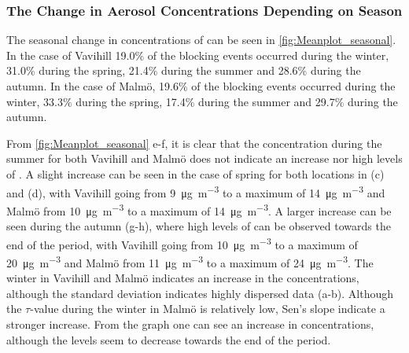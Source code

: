  

\subsubsection{The Change in Aerosol Concentrations Depending on Season}
The seasonal change in concentrations of \PM can be seen in \autoref{fig:Meanplot_seasonal}. In the case of Vavihill 19.0\% of the blocking events occurred during the winter, 31.0\% during the spring, 21.4\% during the summer and 28.6\% during the autumn. In the case of Malmö, 19.6\% of the blocking events occurred during the winter, 33.3\% during the spring, 17.4\% during the summer and 29.7\% during the autumn. 

From \autoref{fig:Meanplot_seasonal} e-f, it is clear that the concentration during the summer for both Vavihill and Malmö does not indicate an increase nor high levels of \PM. A slight increase can be seen in the case of spring for both locations in (c) and (d), with Vavihill going from \SI{9}{\micro\gram\per\meter\cubed} to a maximum of \SI{14}{\micro\gram\per\meter\cubed} and Malmö from \SI{10}{\micro\gram\per\meter\cubed} to a maximum of \SI{14}{\micro\gram\per\meter\cubed}. A larger increase can be seen during the autumn (g-h), where high levels of \PM can be observed towards the end of the period, with Vavihill going from \SI{10}{\micro\gram\per\meter\cubed} to a maximum of \SI{20}{\micro\gram\per\meter\cubed} and Malmö from \SI{11}{\micro\gram\per\meter\cubed} to a maximum of \SI{24}{\micro\gram\per\meter\cubed}. The winter in Vavihill and Malmö indicates an increase in the \PM concentrations, although the standard deviation indicates highly dispersed data (a-b). Although the $\tau$-value during the winter in Malmö is relatively low, Sen's slope indicate a stronger increase. From the graph one can see an increase in \PM concentrations, although the levels seem to decrease towards the end of the period. 

